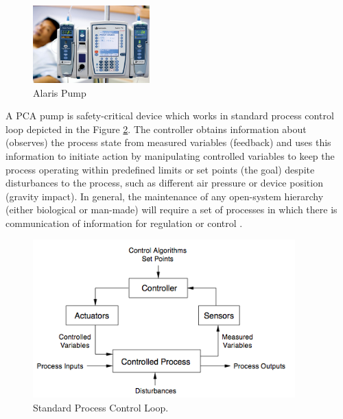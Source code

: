 \begin{figure}
  \begin{center}
    \includegraphics[width=0.4\textwidth]{figures/alaris-pump.png}
  \end{center}
  \caption{Alaris Pump}
  \label{figure:alaris-pump}
\end{figure}

A PCA pump is safety-critical device which works in standard process control loop depicted in the Figure \ref{figure:control-loop}. The controller obtains information about (observes) the process state from measured variables (feedback) and uses this information to initiate action by manipulating controlled variables to keep the process operating within predefined limits or set points (the goal) despite disturbances to the process, such as different air pressure or device position (gravity impact). In general, the maintenance of any open-system hierarchy (either biological or man-made) will require a set of processes in which there is communication of information for regulation or control \cite{SaferWorld}.

\begin{figure}[ht]%
    \begin{center}
    	\includegraphics[width=0.9\textwidth]{figures/safety-critical-loop.png}    	
    \end{center}
    \caption{Standard Process Control Loop.}
    \label{figure:control-loop}
\end{figure}

